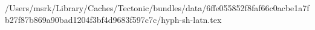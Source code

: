 /Users/msrk/Library/Caches/Tectonic/bundles/data/6ffe055852f8faf66c0acbe1a7fb27f87b869a90bad1204f3bf4d9683f597c7c/hyph-sh-latn.tex